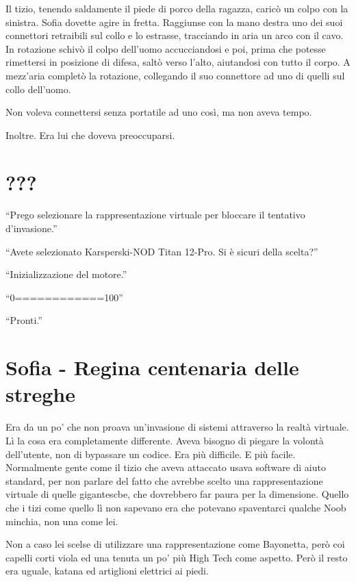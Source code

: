     Il tizio, tenendo saldamente il piede di porco della ragazza, caricò un colpo con la sinistra. Sofia dovette agire
    in fretta. Raggiunse con la mano destra uno dei suoi connettori retraibili sul collo e lo estrasse, tracciando in
    aria un arco con il cavo. In rotazione schivò il colpo dell'uomo accucciandosi e poi, prima che potesse rimettersi
    in posizione di difesa, saltò verso l'alto, aiutandosi con tutto il corpo. A mezz'aria completò la rotazione,
    collegando il suo connettore ad uno di quelli sul collo dell'uomo.

    Non voleva connettersi senza portatile ad uno così, ma non aveva tempo.

    Inoltre. Era lui che doveva preoccuparsi.

  \section*{???}

    ``Prego selezionare la rappresentazione virtuale per bloccare il tentativo d'invasione.''

    ``Avete selezionato Karsperski-NOD Titan 12-Pro. Si è sicuri della scelta?''

    ``Inizializzazione del motore.''

    ``0============100''

    ``Pronti.''

  \section*{Sofia - Regina centenaria delle streghe}

    Era da un po' che non proava un'invasione di sistemi attraverso la realtà virtuale. Lì la cosa era completamente
    differente. Aveva bisogno di piegare la volontà dell'utente, non di bypassare un codice. Era più difficile. E più
    facile. Normalmente gente come il tizio che aveva attaccato usava software di aiuto standard, per non parlare del
    fatto che avrebbe scelto una rappresentazione virtuale di quelle gigantescbe, che dovrebbero far paura per la
    dimensione. Quello che i tizi come quello lì non sapevano era che potevano spaventarci qualche Noob minchia, non una
    come lei.

    Non a caso lei scelse di utilizzare una rappresentazione come Bayonetta, però coi capelli corti viola ed una tenuta
    un po' più High Tech come aspetto. Però il resto era uguale, katana ed artiglioni elettrici ai piedi.

